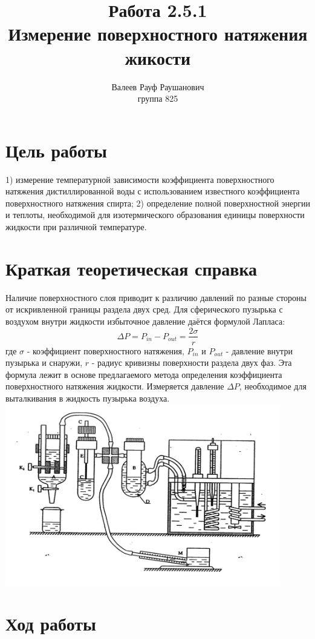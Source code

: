 \documentclass[a4paper, 12pt]{article}%
\author{Валеев Рауф Раушанович \\
группа 825}
\title{\textbf{Работа 2.5.1\\
Измерение поверхностного натяжения жикости}}
\begin{document}
\maketitle
\newpage
\section*{Цель работы}

	1) измерение температурной зависимости  коэффициента поверхностного натяжения дистиллированной воды с использованием известного коэффициента поверхностного натяжения спирта; 2) определение полной поверхностной энергии  и теплоты, необходимой для изотермического образования единицы  поверхности жидкости  при различной температуре. 
\section*{Краткая теоретическая справка}

	Наличие поверхностного слоя приводит к различию давлений по разные стороны от искривленной границы раздела двух сред.  Для сферического пузырька с воздухом  внутри жидкости избыточное давление даётся формулой Лапласа:
\[\Delta P = P_{in} - P_{out} = \dfrac{2 \sigma}{r} \]
где $\sigma$ - коэффициент поверхностного натяжения, $P_{in}$ и $P_{out}$ - давление внутри пузырька и снаружи, $r$ - радиус кривизны поверхности раздела двух фаз. Эта формула лежит в основе предлагаемого метода определения коэффициента поверхностного натяжения жидкости. Измеряется давление $\Delta P$, необходимое для выталкивания в жидкость пузырька воздуха.
\includegraphics[width = 0.9\textwidth]{251_1.jpg}
\section*{Ход работы}
\end{document}

